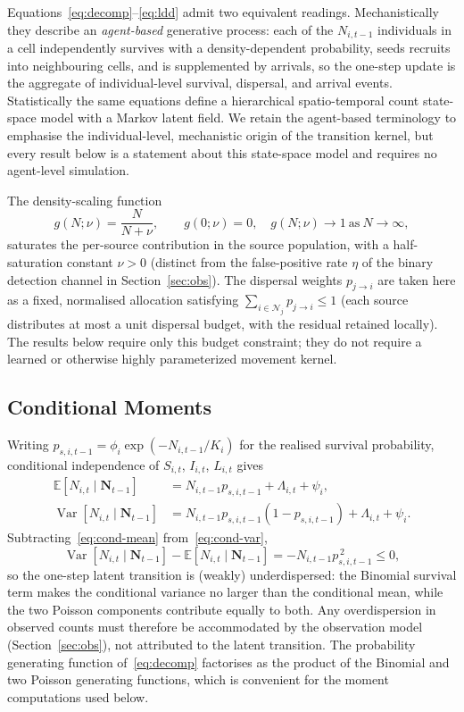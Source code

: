 \documentclass[preprint,12pt]{elsarticle}
\theoremstyle{definition}
\newcommand{\E}{\mathbb{E}}
\newcommand{\Var}{\operatorname{Var}}
\begin{document}
Equations~\eqref{eq:decomp}--\eqref{eq:ldd} admit two equivalent readings.
Mechanistically they describe an \emph{agent-based} generative process: each of
the $N_{i,t-1}$ individuals in a cell independently survives with a
density-dependent probability, seeds recruits into neighbouring cells, and is
supplemented by arrivals, so the one-step update is the aggregate of
individual-level survival, dispersal, and arrival events. Statistically the same
equations define a hierarchical spatio-temporal count state-space model with a
Markov latent field. We retain the agent-based terminology to emphasise the
individual-level, mechanistic origin of the transition kernel, but every result
below is a statement about this state-space model and requires no agent-level
simulation.

The density-scaling function
\begin{equation}
  g(N;\nu)=\frac{N}{N+\nu},\qquad
  g(0;\nu)=0,\quad g(N;\nu)\to1\ \text{as}\ N\to\infty,
  \label{eq:density-scale}
\end{equation}
saturates the per-source contribution in the source population, with a half-saturation constant $\nu>0$ (distinct from the false-positive rate $\eta$ of the binary detection channel in Section~\ref{sec:obs}). The
dispersal weights $p_{j\to i}$ are taken here as a fixed, normalised
allocation satisfying $\sum_{i\in\mathcal{N}_j}p_{j\to i}\le1$ (each source
distributes at most a unit dispersal budget, with the residual retained
locally). The results below require only this budget constraint; they do not
require a learned or otherwise highly parameterized movement kernel.

\subsection{Conditional Moments}
\label{sec:moments}

Writing $p_{s,i,t-1}=\phi_i\exp(-N_{i,t-1}/K_i)$ for the realised survival
probability, conditional independence of $S_{i,t}$, $I_{i,t}$, $L_{i,t}$
gives
\begin{align}
  \E[N_{i,t}\mid\mathbf{N}_{t-1}]
  &=N_{i,t-1}p_{s,i,t-1}+\Lambda_{i,t}+\psi_i,
  \label{eq:cond-mean}\\
  \Var[N_{i,t}\mid\mathbf{N}_{t-1}]
  &=N_{i,t-1}p_{s,i,t-1}(1-p_{s,i,t-1})+\Lambda_{i,t}+\psi_i.
  \label{eq:cond-var}
\end{align}
Subtracting~\eqref{eq:cond-mean} from~\eqref{eq:cond-var},
\begin{equation}
  \Var[N_{i,t}\mid\mathbf{N}_{t-1}]-\E[N_{i,t}\mid\mathbf{N}_{t-1}]
  =-N_{i,t-1}p_{s,i,t-1}^{\,2}\le0,
  \label{eq:var-minus-mean}
\end{equation}
so the one-step latent transition is (weakly) underdispersed: the Binomial
survival term makes the conditional variance no larger than the conditional
mean, while the two Poisson components contribute equally to both. Any
overdispersion in observed counts must therefore be accommodated by the
observation model (Section~\ref{sec:obs}), not attributed to the latent
transition. The probability generating function of~\eqref{eq:decomp}
factorises as the product of the Binomial and two Poisson generating
functions, which is convenient for the moment computations used below.
\end{document}
